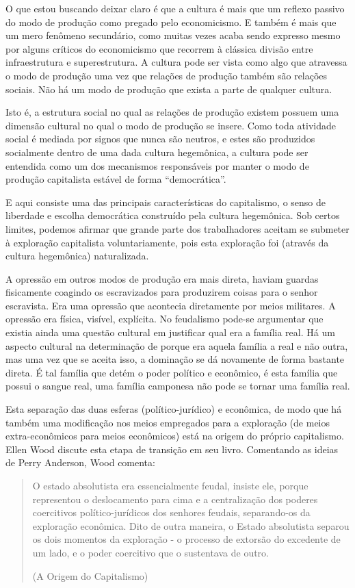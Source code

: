 O que estou buscando deixar claro é que a cultura é mais que um reflexo passivo do modo de produção como pregado pelo economicismo. E também é mais que um mero fenômeno secundário, como muitas vezes acaba sendo expresso mesmo por alguns críticos do economicismo que recorrem à clássica divisão entre infraestrutura e superestrutura. A cultura pode ser vista como algo que atravessa o modo de produção uma vez que relações de produção também são relações sociais. Não há um modo de produção que exista a parte de qualquer cultura.

Isto é, a estrutura social no qual as relações de produção existem possuem uma dimensão cultural no qual o modo de produção se insere. Como toda atividade social é mediada por signos que nunca são neutros, e estes são produzidos socialmente dentro de uma dada cultura hegemônica, a cultura pode ser entendida como um dos mecanismos responsáveis por manter o modo de produção capitalista estável de forma “democrática”.

E aqui consiste uma das principais características do capitalismo, o senso de liberdade e escolha democrática construído pela cultura hegemônica. Sob certos limites, podemos afirmar que grande parte dos trabalhadores aceitam se submeter à exploração capitalista voluntariamente, pois esta exploração foi (através da cultura hegemônica) naturalizada.

A opressão em outros modos de produção era mais direta, haviam guardas fisicamente coagindo os escravizados para produzirem coisas para o senhor escravista. Era uma opressão que acontecia diretamente por meios militares. A opressão era física, visível, explícita. No feudalismo pode-se argumentar que existia ainda uma questão cultural em justificar qual era a família real. Há um aspecto cultural na determinação de porque era aquela família a real e não outra, mas uma vez que se aceita isso, a dominação se dá novamente de forma bastante direta. É tal família que detém o poder político e econômico, é esta família que possui o sangue real, uma família camponesa não pode se tornar uma família real.

Esta separação das duas esferas (político-jurídico) e econômica, de modo que há também uma modificação nos meios empregados para a exploração (de meios extra-econômicos para meios econômicos) está na origem do próprio capitalismo. Ellen Wood discute esta etapa de transição em seu livro. Comentando as ideias de Perry Anderson, Wood comenta:

\begin{quote}
O estado absolutista era essencialmente feudal, insiste ele, porque representou o deslocamento para cima e a centralização dos poderes coercitivos político-jurídicos dos senhores feudais, separando-os da exploração econômica. Dito de outra maneira, o Estado absolutista separou os dois momentos da exploração - o processo de extorsão do excedente de um lado, e o poder coercitivo que o sustentava de outro.

(A Origem do Capitalismo)
\end{quote}

